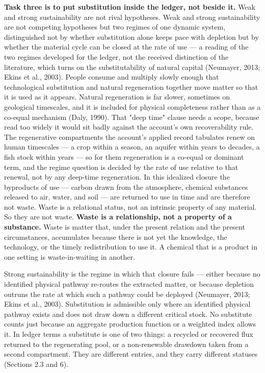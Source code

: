 \documentclass[11pt]{article}
\begin{document}
\textbf{Task three is to put substitution inside the ledger, not beside it.} Weak and strong sustainability are not rival hypotheses. Weak and strong sustainability are not competing hypotheses but two regimes of one dynamic system, distinguished not by whether substitution alone keeps pace with depletion but by whether the material cycle can be closed at the rate of use --- a reading of the two regimes developed for the ledger, not the received distinction of the literature, which turns on the substitutability of natural capital (Neumayer, 2013; Ekins et al., 2003). People consume and multiply slowly enough that technological substitution and natural regeneration together move matter so that it is used as it appears. Natural regeneration is far slower, sometimes on geological timescales, and it is included for physical completeness rather than as a co-equal mechanism (Daly, 1990). That "deep time" clause needs a scope, because read too widely it would sit badly against the account's own recoverability rule. The regenerative compartments the account's applied record tabulates renew on human timescales --- a crop within a season, an aquifer within years to decades, a fish stock within years --- so for them regeneration is a co-equal or dominant term, and the regime question is decided by the rate of use relative to that renewal, not by any deep-time regeneration. In this idealized closure the byproducts of use --- carbon drawn from the atmosphere, chemical substances released to air, water, and soil --- are returned to use in time and are therefore not waste. Waste is a relational status, not an intrinsic property of any material. So they are not waste. \textbf{Waste is a relationship, not a property of a substance.} Waste is matter that, under the present relation and the present circumstances, accumulates because there is not yet the knowledge, the technology, or the timely redistribution to use it. A chemical that is a product in one setting is waste-in-waiting in another.

Strong sustainability is the regime in which that closure fails --- either because no identified physical pathway re-routes the extracted matter, or because depletion outruns the rate at which such a pathway could be deployed (Neumayer, 2013; Ekins et al., 2003). Substitution is admissible only where an identified physical pathway exists and does not draw down a different critical stock. No substitute counts just because an aggregate production function or a weighted index allows it. In ledger terms a substitute is one of two things: a recycled or recovered flux returned to the regenerating pool, or a non-renewable drawdown taken from a second compartment. They are different entries, and they carry different statuses (Sections 2.3 and 6).
\end{document}
